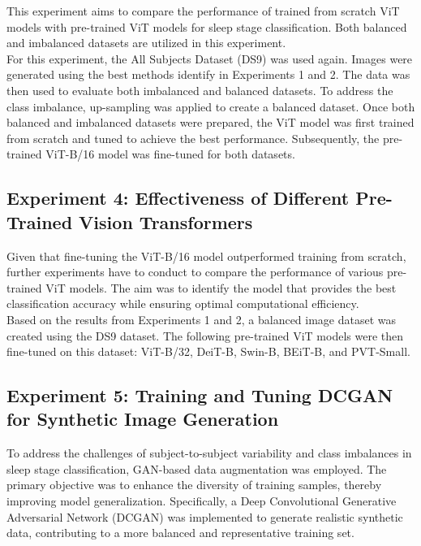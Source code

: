 This experiment aims to compare the performance of trained from scratch ViT models with pre-trained ViT models for sleep stage classification. Both balanced and imbalanced datasets are utilized in this experiment. \\

For this experiment, the All Subjects Dataset (DS9) was used again. Images were generated using the best methods identify in Experiments 1 and 2. The data was then used to evaluate both imbalanced and balanced datasets. To address the class imbalance, up-sampling was applied to create a balanced dataset. Once both balanced and imbalanced datasets were prepared, the ViT model was first trained from scratch and tuned to achieve the best performance. Subsequently, the pre-trained ViT-B/16 model was fine-tuned for both datasets.

\subsection{Experiment 4: Effectiveness of Different Pre-Trained Vision Transformers}

Given that fine-tuning the ViT-B/16 model outperformed training from scratch, further experiments have to conduct to compare the performance of various pre-trained ViT models. The aim was to identify the model that provides the best classification accuracy while ensuring optimal computational efficiency. \\

Based on the results from Experiments 1 and 2, a balanced image dataset was created using the DS9 dataset. The following pre-trained ViT models were then fine-tuned on this dataset: ViT-B/32, DeiT-B, Swin-B, BEiT-B, and PVT-Small.

\subsection{Experiment 5: Training and Tuning DCGAN for Synthetic Image Generation}

To address the challenges of subject-to-subject variability and class imbalances in sleep stage classification, GAN-based data augmentation was employed. The primary objective was to enhance the diversity of training samples, thereby improving model generalization. Specifically, a Deep Convolutional Generative Adversarial Network (DCGAN) was implemented to generate realistic synthetic data, contributing to a more balanced and representative training set. \\

